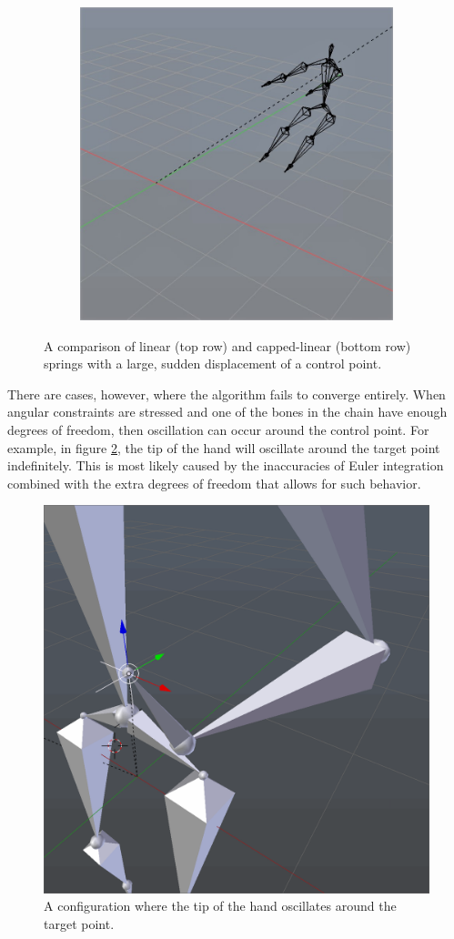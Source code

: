 \documentclass[10pt,twocolumn,letterpaper]{article}
\begin{document}
\begin{figure}
\begin{subfigure}{0.2\textwidth}
        \centering
        \includegraphics[width=.9\linewidth]{capped-cannon-1000.jpg}
    \end{subfigure}

    \caption{A comparison of linear (top row) and capped-linear (bottom row) springs with a large, sudden displacement of a control point.}
    \label{img:cannon}
\end{figure}

There are cases, however, where the algorithm fails to converge entirely. When angular constraints are stressed and one of the bones in the chain have enough degrees of freedom, then oscillation can occur around the control point. For example, in figure \ref{img:wobble}, the tip of the hand will oscillate around the target point indefinitely. This is most likely caused by the inaccuracies of Euler integration combined with the extra degrees of freedom that allows for such behavior.

\begin{figure}[]
    \centering
    \includegraphics[width=0.7\columnwidth] {wobble-frame.png}
    \caption{A configuration where the tip of the hand oscillates around the target point.}
    \label{img:wobble}
\end{figure}
\end{document}
